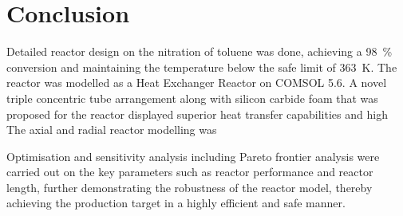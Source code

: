 \section{Conclusion} \label{sec:conclusion}
Detailed reactor design on the nitration of toluene was done, achieving a \SI{98}{\%} conversion and maintaining the temperature below the safe limit of \SI{363}{\K}. The reactor was modelled as a Heat Exchanger Reactor on COMSOL 5.6. A novel triple concentric tube arrangement along with silicon carbide foam that was proposed for the reactor displayed superior heat transfer capabilities and high
The axial and radial reactor modelling was 

Optimisation and sensitivity analysis including Pareto frontier analysis were carried out on the key parameters such as reactor performance and reactor length, further demonstrating the robustness of the reactor model, thereby achieving the production target in a highly efficient and safe manner.  

